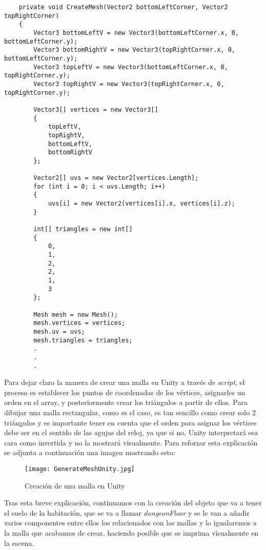 \begin{lstlisting}
    private void CreateMesh(Vector2 bottomLeftCorner, Vector2 topRightCorner)
    {
        Vector3 bottomLeftV = new Vector3(bottomLeftCorner.x, 0, bottomLeftCorner.y);
        Vector3 bottomRightV = new Vector3(topRightCorner.x, 0, bottomLeftCorner.y);
        Vector3 topLeftV = new Vector3(bottomLeftCorner.x, 0, topRightCorner.y);
        Vector3 topRightV = new Vector3(topRightCorner.x, 0, topRightCorner.y);

        Vector3[] vertices = new Vector3[]
        {
            topLeftV,
            topRightV,
            bottomLeftV,
            bottomRightV
        };

        Vector2[] uvs = new Vector2[vertices.Length];
        for (int i = 0; i < uvs.Length; i++)
        { 
            uvs[i] = new Vector2(vertices[i].x, vertices[i].z);
        }

        int[] triangles = new int[]
        {
            0,
            1,
            2,
            2,
            1,
            3
        };

        Mesh mesh = new Mesh();
        mesh.vertices = vertices;
        mesh.uv = uvs;
        mesh.triangles = triangles;
        .
        .
        .
\end{lstlisting}

Para dejar claro la manera de crear una malla en Unity a través de \textit{script}, el proceso es establecer los puntos de coordenadas de los vértices, asignarles un orden en el array, y posteriormente crear los triángulos a partir de ellos. Para dibujar una malla rectangular, como es el caso, es tan sencillo como crear solo 2 triángulos y es importante tener en cuenta que el orden para asignar los vértices debe ser en el sentido de las agujas del reloj, ya que si no, Unity interpretará esa cara como invertida y no la mostrará visualmente. Para reforzar esta explicación se adjunta a continuación una imagen mostrando esto: 

\begin{figure}[H]
    \centering
    \texttt{[image: GenerateMeshUnity.jpg]}
    \caption{Creación de una malla en Unity}
\end{figure}

Tras esta breve explicación, continuamos con la creación del objeto que va a tener el suelo de la habitación, que se va a llamar \textit{dungeonFloor} y se le van a añadir varios componentes entre ellos los relacionados con las mallas y lo igualaremos a la malla que acabamos de crear, haciendo posible que se imprima visualmente en la escena. 

